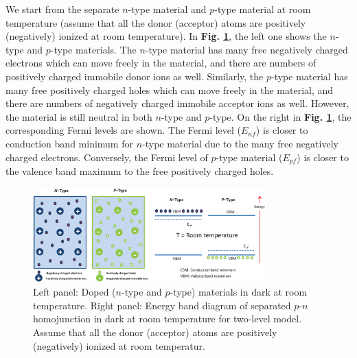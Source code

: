 \documentclass[a4paper, 12pt, titlepage,oneside,drop]{kthesis}
\begin{document}
We start from the separate $n$-type material and $p$-type material at room temperature (assume that all the donor (acceptor) atoms are positively (negatively) ionized at room temperature). In \textbf{Fig. \ref{dopedmaterials}},
the left one shows the $n$-type and $p$-type materials. The $n$-type
material has many free negatively charged electrons which can move freely in the material, and there are numbers of positively charged immobile donor ions as well. Similarly, the $p$-type material has many free positively
charged holes which can move freely in the material, and there are numbers of negatively charged immobile acceptor ions as well. However, the material is still neutral in both $n$-type and $p$-type.
On the right in \textbf{Fig. \ref{dopedmaterials}}, the corresponding Fermi levels are shown. The Fermi level ($E_{nf}$) is closer to conduction band minimum for $n$-type material due to the many free 
negatively charged electrons. Conversely, the Fermi level of $p$-type material ($E_{pf}$) is closer to the valence band maximum to the free positively charged holes.

\begin{figure}[H]
    \begin{center}
            \includegraphics[width=0.8\textwidth,clip]{sepratepn.eps}
     \end{center}
    \caption{Left panel: Doped ($n$-type and $p$-type) materials in dark at room temperature. Right panel: Energy band diagram of separated $p$-$n$ homojunction in dark at room temperature for two-level model. Assume that all the donor (acceptor) atoms are 
    positively (negatively) ionized at room temperatur.}      
    \label{dopedmaterials}
\end{figure}
\end{document}
